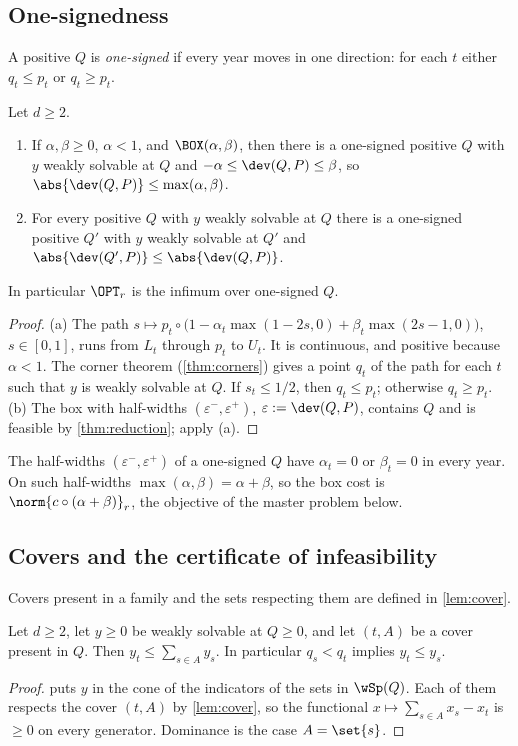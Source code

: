 \subsection{One-signedness}
A positive $Q$ is \emph{one-signed} if every year moves in one direction: for each $t$ either $q_t\le p_t$ or $q_t\ge p_t$.
\begin{theorem}\label{thm:onesigned}
Let $d\ge2$.
\begin{enumerate}[label=(\alph*)]
\item If $\alpha,\beta\ge0$, $\alpha<1$, and $\BOX(\alpha,\beta)$, then there is a one-signed positive $Q$ with $y$ weakly solvable at $Q$ and $-\alpha\le\dev(Q,P)\le\beta$, so $\abs{\dev(Q,P)}\le\max(\alpha,\beta)$.
\item For every positive $Q$ with $y$ weakly solvable at $Q$ there is a one-signed positive $Q'$ with $y$ weakly solvable at $Q'$ and $\abs{\dev(Q',P)}\le\abs{\dev(Q,P)}$.
\end{enumerate}
In particular $\OPT_r$ is the infimum over one-signed $Q$.
\end{theorem}
\begin{proof}
(a) The path $s\mapsto p_t\circ\bigl(1-\alpha_t\max(1-2s,0)+\beta_t\max(2s-1,0)\bigr)$, $s\in[0,1]$, runs from $L_t$ through $p_t$ to $U_t$. It is continuous, and positive because $\alpha<1$. The corner theorem (\cref{thm:corners}) gives a point $q_t$ of the path for each $t$ such that $y$ is weakly solvable at $Q$. If $s_t\le1/2$, then $q_t\le p_t$; otherwise $q_t\ge p_t$. (b) The box with half-widths $(\varepsilon^-,\varepsilon^+)$, $\varepsilon:=\dev(Q,P)$, contains $Q$ and is feasible by \cref{thm:reduction}; apply (a).
\end{proof}
The half-widths $(\varepsilon^-,\varepsilon^+)$ of a one-signed $Q$ have $\alpha_t=0$ or $\beta_t=0$ in every year. On such half-widths $\max(\alpha,\beta)=\alpha+\beta$, so the box cost is $\norm{c\circ(\alpha+\beta)}_r$, the objective of the master problem below.

\subsection{Covers and the certificate of infeasibility}\label{sec:covers}
Covers present in a family and the sets respecting them are defined in \cref{lem:cover}.
\begin{proposition}[cover]\label{prop:cover}
Let $d\ge2$, let $y\ge0$ be weakly solvable at $Q\ge0$, and let $(t,A)$ be a cover present in $Q$. Then $y_t\le\sum_{s\in A}y_s$. In particular $q_s<q_t$ implies $y_t\le y_s$.
\end{proposition}
\begin{proof}
 puts $y$ in the cone of the indicators of the sets in $\wSp(Q)$. Each of them respects the cover $(t,A)$ by \cref{lem:cover}, so the functional $x\mapsto\sum_{s\in A}x_s-x_t$ is $\ge0$ on every generator. Dominance is the case $A=\set{s}$.
\end{proof}


